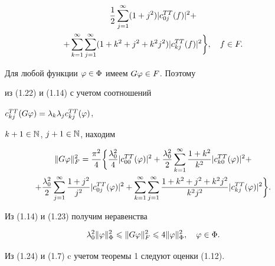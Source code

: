 \begin{pf}
\begin{gather}
\frac{1}{2}\suml_{j=1}^\infty (1+j^2)|c_{0j}^{TT}(f)|^2 +\notag\\


%


+\suml_{k=1}^\infty \suml_{j=1}^\infty(1+k^2+j^2+k^2j^2)|


c_{kj}^{TT}(f)|^2\bigg\},\quad f\in F.


\end{gather}





Для любой функции $\varphi\in \Phi$ имеем $G\varphi \in F$. Поэтому 


из (1.22) и (1.14) с учетом соотношений 


$c_{kj}^{TT}(G\varphi) = \lambda_k \lambda_j c_{kj}^{TT}(\varphi)$,


$k+1\in\Bbb N$, $j+1\in\Bbb N$, находим


\begin{gather}


\|G\vp\|_F^2 = \frac{\pi^2}{4}\bigg\{


\frac{\lambda_0^2}{4}|c_{00}^{TT}(\vp)|^2+


\frac{\lambda_0^2}{2}\suml_{k=1}^\infty


\frac{1+k^2}{k^2}|c_{k0}^{TT}(\vp)|^2 + \notag\\


%


+\frac{\lambda_0^2}{2}\suml_{j=1}^\infty


\frac{1+j^2}{j^2}|c_{0j}^{TT}(\vp)|^2 + 


\suml_{k=1}^\infty\suml_{j=1}^\infty


\frac{1+k^2+j^2+k^2j^2}{k^2j^2}|c_{kj}^{TT}(\vp)|^2\bigg\}.


\end{gather}





Из (1.14) и (1.23) получим неравенства


\begin{equation}


\lambda_0^2\|\vp\|^2_\Phi \lea \|G\vp\|_F^2 \lea 


4\|\vp\|_\Phi^2,\quad \vp\in\Phi.


\end{equation}


Из (1.24) и (1.7) c учетом теоремы 1 следуют оценки (1.12).


\end{pf}








